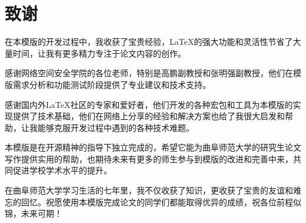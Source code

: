 \section*{致谢}

在本模版的开发过程中，我收获了宝贵经验，\LaTeX{}的强大功能和灵活性节省了大量时间，让我有更多精力专注于论文内容的创作。

感谢网络空间安全学院的各位老师，特别是高鹏副教授和张明强副教授，他们在模版需求分析和功能测试阶段提供了专业建议和技术支持。

感谢国内外\LaTeX{}社区的专家和爱好者，他们开发的各种宏包和工具为本模版的实现提供了技术基础，他们在网络上分享的经验和解决方案也给了我很大启发和帮助，让我能够克服开发过程中遇到的各种技术难题。

本模版是在开源精神的指导下独立完成的，希望它能为曲阜师范大学的研究生论文写作提供实用的帮助，也期待未来有更多的师生参与到模版的改进和完善中来，共同促进学校学术水平的提升。

在曲阜师范大学学习生活的七年里，我不仅收获了知识，更收获了宝贵的友谊和难忘的回忆。祝愿使用本模版完成论文的同学们都能取得优异的成绩，祝各位前程似锦，未来可期！